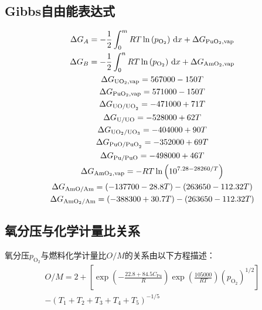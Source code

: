 \subsection{Gibbs自由能表达式}
\begin{gather}
	\Delta G_A
	= -\frac{1}{2} \int_0^m RT \ln\left(p_{\text{O}_2}\right)\,\mathrm{d}x
	+ \Delta G_{\text{PuO}_2,\text{vap}}
	\notag
	\\
	\Delta G_B
	= -\frac{1}{2} \int_0^n RT \ln\left(p_{\text{O}_2}\right)\,\mathrm{d}x
	+ \Delta G_{\text{AmO}_2,\text{vap}}
	\notag
	\\
	\Delta G_{\text{UO}_2,\text{vap}}
	= 567000 - 150T
	\notag
	\\
	\Delta G_{\text{PuO}_2,\text{vap}}
	= 571000 - 150T
	\notag
	\\
	\Delta G_{\text{UO/UO}_2}
	= -471000 + 71T
	\notag
	\\
	\Delta G_{\text{U/UO}}
	= -528000 + 62T
	\notag
	\\
	\Delta G_{\text{UO}_2/\text{UO}_3}
	= -404000 + 90T
	\notag
	\\
	\Delta G_{\text{PuO/PuO}_2}
	= -352000 + 69T
	\notag
	\\
	\Delta G_{\text{Pu/PuO}}
	= -498000 + 46T
	\notag
	\\
	\Delta G_{\text{AmO}_2,\text{vap}}
	= -RT \ln\left(10^{7.28 - 28260/T}\right)
	\notag
	\\
	\Delta G_{\text{AmO/Am}}
	= (-137700 - 28.8T) - (263650 - 112.32T)
	\notag
	\\
	\Delta G_{\text{AmO}_2/\text{Am}}
	= (-388300 + 30.7T) - (263650 - 112.32T)
	\label{eq:app_b_rand_markin_gibbs_relations}
\end{gather}

\subsection{氧分压与化学计量比关系}
氧分压$p_{\text{O}_2}$与燃料化学计量比$O/M$的关系由以下方程描述：
\begin{equation}
	\begin{gathered}
		O/M = 2
		+ \left[
		\exp\left( -\frac{22.8 + 84.5 C_{\text{Pu}}}{R} \right)
		\exp\left( \frac{105000}{RT} \right)
		(p_{\text{O}_2})^{1/2}
		\right] \\
		- \left( T_1 + T_2 + T_3 + T_4 + T_5 \right)^{-1/5}
	\end{gathered}
	\label{eq:app_b_oxygen_pressure_stoichiometry}
\end{equation}

